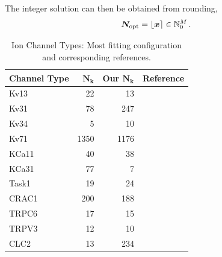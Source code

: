 \documentclass[USenglish,twocolumn]{article}
\begin{document}
  The integer solution can then be obtained from rounding,
  $${\bm{N}}_{\rm opt} = \lfloor {\bm{x}} \rceil \in \mathbb{N}_0^M\,.$$

  \begin{table}
    \caption{Ion Channel Types: Most fitting configuration and corresponding references.}
    \begin{tabular}{lrrl}
      \textbf{Channel Type} & \textbf{$\bm{N_k}$ \cite{2021-A549-model}} & \textbf{Our $\bm{N_k}$} & \textbf{Reference}            \\
      \midrule
      Kv13                  & 22                                         & 13                      & \cite{1998-potassium-channel} \\
      Kv31                  & 78                                         & 247                     & \cite{1998-potassium-channel} \\
      Kv34                  & 5                                          & 10                      & \cite{1998-potassium-channel} \\
      Kv71                  & 1350                                       & 1176                    & \cite{1998-potassium-channel} \\
      KCa11                 & 40                                         & 38                      & \cite{1998-potassium-channel} \\
      KCa31                 & 77                                         & 7                       & \cite{1998-potassium-channel} \\
      Task1                 & 19                                         & 24                      & \cite{1998-potassium-channel} \\
      CRAC1                 & 200                                        & 188                     & \cite{1998-potassium-channel} \\
      TRPC6                 & 17                                         & 15                      & \cite{1998-potassium-channel} \\
      TRPV3                 & 12                                         & 10                      & \cite{1998-potassium-channel} \\
      CLC2                  & 13                                         & 234                     & \cite{1998-potassium-channel} \\
    \end{tabular}
    \label{table:channel-types}
  \end{table}
\end{document}
